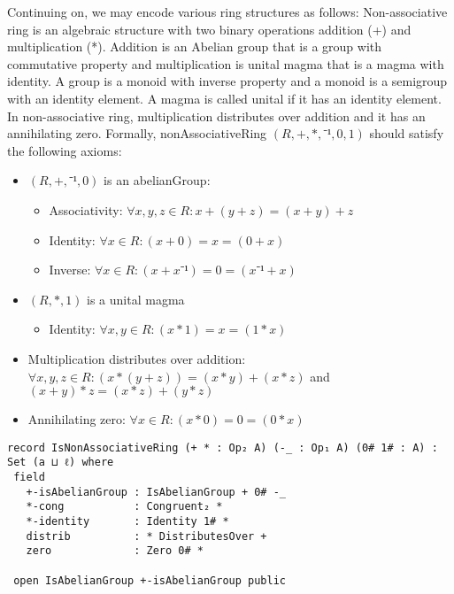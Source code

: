 Continuing on, we may encode various ring structures as follows: Non-associative
ring is an algebraic structure with two binary operations addition (+) and
multiplication (*). Addition is an Abelian group that is a group with
commutative property and multiplication is unital magma that is a magma with
identity. A group is a monoid with inverse property and a monoid is a semigroup
with an identity element. A magma is called unital if it has an identity
element. In non-associative ring, multiplication distributes over addition and
it has an annihilating zero. Formally, nonAssociativeRing $(R,+,*,⁻¹,0,1)$
should satisfy the following axioms:
\begin{itemize}
  \item $(R,+,⁻¹,0)$ is an abelianGroup:
   \begin{itemize}
    \item Associativity: $\forall x,y,z \in R: x + (y + z) = (x + y) + z$
    \item Identity: $\forall x \in R: (x + 0) = x = (0 + x)$
    \item Inverse: $\forall x \in R: (x + x⁻¹) = 0 = (x⁻¹ + x)$
  \end{itemize}
  \item $(R,*,1)$ is a unital magma
  \begin{itemize}
    \item Identity: $\forall x,y \in R: (x * 1) = x = (1 * x)$
  \end{itemize}
  \item Multiplication distributes over addition: \(\forall x , y , z \in R: (x * (y + z)) = (x * y) + (x
  * z)\) and \( (x + y) * z = (x * z) + (y * z) \)
  \item Annihilating zero: \(\forall x \in R: (x * 0) = 0 = (0 * x)\)
\end{itemize}
\begin{verbatim}
record IsNonAssociativeRing (+ * : Op₂ A) (-_ : Op₁ A) (0# 1# : A) : Set (a ⊔ ℓ) where
 field
   +-isAbelianGroup : IsAbelianGroup + 0# -_
   *-cong           : Congruent₂ *
   *-identity       : Identity 1# *
   distrib          : * DistributesOver +
   zero             : Zero 0# *

 open IsAbelianGroup +-isAbelianGroup public
\end{verbatim}

